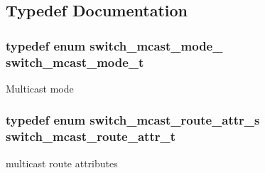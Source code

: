 \subsection{Typedef Documentation}
\hypertarget{group__MULTICAST_ga4559597730b0814511eb5ae86dd2bf31}{
\subsubsection[{switch\+\_\+mcast\+\_\+mode\+\_\+t}]{\setlength{\rightskip}{0pt plus 5cm}typedef enum {\bf switch\+\_\+mcast\+\_\+mode\+\_\+}  {\bf switch\+\_\+mcast\+\_\+mode\+\_\+t}}}\label{group__MULTICAST_ga4559597730b0814511eb5ae86dd2bf31}
Multicast mode \hypertarget{group__MULTICAST_ga2312dc87779fff0cad006e54ae20bae4}{
\subsubsection[{switch\+\_\+mcast\+\_\+route\+\_\+attr\+\_\+t}]{\setlength{\rightskip}{0pt plus 5cm}typedef enum {\bf switch\+\_\+mcast\+\_\+route\+\_\+attr\+\_\+s}  {\bf switch\+\_\+mcast\+\_\+route\+\_\+attr\+\_\+t}}}\label{group__MULTICAST_ga2312dc87779fff0cad006e54ae20bae4}
multicast route attributes 

